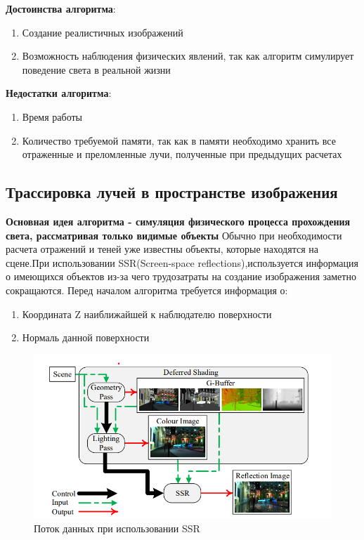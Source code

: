 \documentclass[a4paper,14pt, unknownkeysallowed]{extreport}
\begin{document}
\textbf{Достоинства алгоритма}:
\begin{enumerate}
	\item Создание реалистичных изображений
	\item Возможность наблюдения физических явлений, так как алгоритм симулирует поведение света в реальной жизни
\end{enumerate}


\textbf{Недостатки алгоритма}:
\begin{enumerate}
	\item Время работы
	\item Количество требуемой памяти, так как в памяти необходимо хранить все отраженные и преломленные лучи, полученные при предыдущих расчетах
\end{enumerate}


\subsection{Трассировка лучей в пространстве изображения}
\textbf{Основная идея алгоритма - симуляция физического процесса прохождения света, рассматривая только видимые объекты} \newline
Обычно при необходимости расчета отражений и теней уже известны объекты, которые находятся на сцене.При использовании SSR(Screen-space reflections),используется информация о имеющихся
объектов из-за чего трудозатраты на создание изображения заметно сокращаются.\cite{SSR}
Перед началом алгоритма требуется информация о:
\begin{enumerate}
	\item Координата Z наиближайшей к наблюдателю поверхности
	\item Нормаль данной поверхности
\end{enumerate}

\begin{figure}[H]
	\centering
	\includegraphics{SSR_data_flow.png}
	\caption{Поток данных при использовании SSR}
	\label{fig:SSR_data_flow}
\end{figure} 
\end{document}
